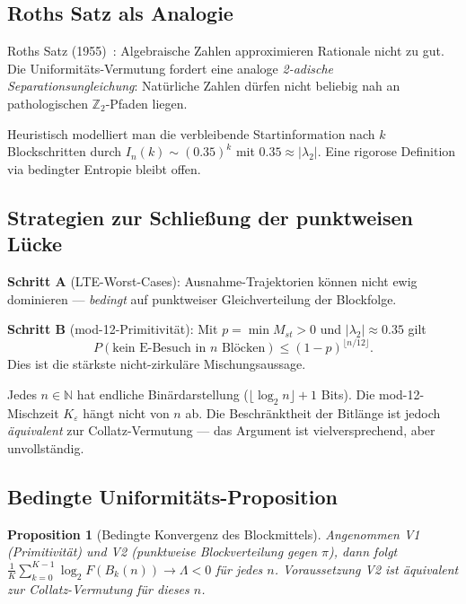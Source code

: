 \documentclass[12pt,a4paper]{article}
\newtheorem{proposition}[satz]{Proposition}
\newcommand{\N}{\mathbb{N}}
\newcommand{\Ztwo}{\mathbb{Z}_2}
\newcommand{\Lam}{\Lambda}
\begin{document}
\subsection{Roths Satz als Analogie}

Roths Satz (1955)~\cite{Roth1955}: Algebraische Zahlen approximieren Rationale
nicht zu gut. Die Uniformitäts-Vermutung fordert eine analoge
\emph{2-adische Separationsungleichung}: Natürliche Zahlen dürfen nicht
beliebig nah an pathologischen $\Ztwo$-Pfaden liegen.

Heuristisch modelliert man die verbleibende Startinformation nach
$k$ Blockschritten durch $I_n(k) \sim (0.35)^k$ mit
$0.35 \approx |\lambda_2|$. Eine rigorose Definition via bedingter
Entropie bleibt offen.

\subsection{Strategien zur Schließung der punktweisen Lücke}

\textbf{Schritt A} (LTE-Worst-Cases): Ausnahme-Trajektorien können nicht
ewig dominieren --- \emph{bedingt} auf punktweiser Gleichverteilung der
Blockfolge.

\textbf{Schritt B} (mod-12-Primitivität): Mit $p=\min M_{st}>0$ und
$|\lambda_2|\approx 0.35$ gilt
\[
  P(\text{kein E-Besuch in }n\text{ Blöcken})\leq (1-p)^{\lfloor n/12\rfloor}.
\]
Dies ist die stärkste nicht-zirkuläre Mischungsaussage.

\begin{tcolorbox}[offen,title={Schritt C: Binärinformation (bedingt)}]
Jedes $n \in \N$ hat endliche Binärdarstellung ($\lfloor\log_2 n\rfloor+1$
Bits). Die mod-12-Mischzeit $K_\varepsilon$ hängt nicht von $n$ ab.
Die Beschränktheit der Bitlänge ist jedoch \emph{äquivalent} zur
Collatz-Vermutung --- das Argument ist vielversprechend, aber unvollständig.
\end{tcolorbox}

\subsection{Bedingte Uniformitäts-Proposition}

\begin{proposition}[Bedingte Konvergenz des Blockmittels]
Angenommen V1 (Primitivität) und V2 (punktweise Blockverteilung gegen $\pi$),
dann folgt $\frac{1}{K}\sum_{k=0}^{K-1}\log_2 F(B_k(n))\to\Lam<0$ für jedes
$n$. Voraussetzung V2 ist äquivalent zur Collatz-Vermutung für dieses $n$.
\end{proposition}
\end{document}
